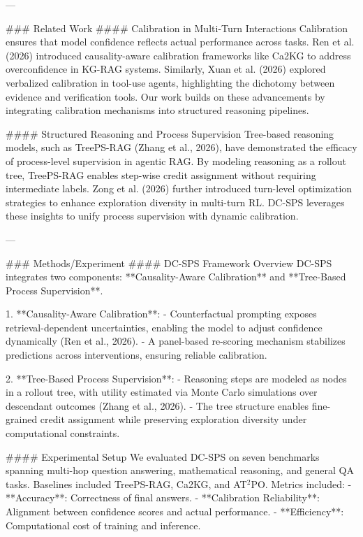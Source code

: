 ---

### Related Work
#### Calibration in Multi-Turn Interactions
Calibration ensures that model confidence reflects actual performance across tasks. Ren et al. (2026) introduced causality-aware calibration frameworks like Ca2KG to address overconfidence in KG-RAG systems. Similarly, Xuan et al. (2026) explored verbalized calibration in tool-use agents, highlighting the dichotomy between evidence and verification tools. Our work builds on these advancements by integrating calibration mechanisms into structured reasoning pipelines.

#### Structured Reasoning and Process Supervision
Tree-based reasoning models, such as TreePS-RAG (Zhang et al., 2026), have demonstrated the efficacy of process-level supervision in agentic RAG. By modeling reasoning as a rollout tree, TreePS-RAG enables step-wise credit assignment without requiring intermediate labels. Zong et al. (2026) further introduced turn-level optimization strategies to enhance exploration diversity in multi-turn RL. DC-SPS leverages these insights to unify process supervision with dynamic calibration.

---

### Methods/Experiment
#### DC-SPS Framework Overview
DC-SPS integrates two components: **Causality-Aware Calibration** and **Tree-Based Process Supervision**.

1. **Causality-Aware Calibration**:
   - Counterfactual prompting exposes retrieval-dependent uncertainties, enabling the model to adjust confidence dynamically (Ren et al., 2026).
   - A panel-based re-scoring mechanism stabilizes predictions across interventions, ensuring reliable calibration.

2. **Tree-Based Process Supervision**:
   - Reasoning steps are modeled as nodes in a rollout tree, with utility estimated via Monte Carlo simulations over descendant outcomes (Zhang et al., 2026).
   - The tree structure enables fine-grained credit assignment while preserving exploration diversity under computational constraints.

#### Experimental Setup
We evaluated DC-SPS on seven benchmarks spanning multi-hop question answering, mathematical reasoning, and general QA tasks. Baselines included TreePS-RAG, Ca2KG, and AT$^2$PO. Metrics included:
- **Accuracy**: Correctness of final answers.
- **Calibration Reliability**: Alignment between confidence scores and actual performance.
- **Efficiency**: Computational cost of training and inference.

